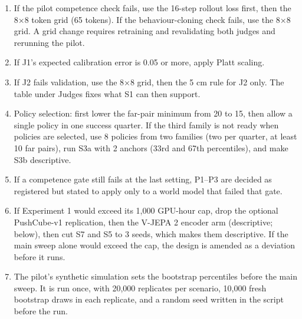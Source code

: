 \documentclass[10pt,letterpaper]{article}
\providecommand{\tightlist}{\setlength{\itemsep}{0pt}\setlength{\parskip}{0pt}}
\begin{document}
\begin{enumerate}
\def\labelenumi{\arabic{enumi}.}
\tightlist
\item
  If the pilot competence check fails, use the 16-step
  rollout loss first, then the 8×8 token grid (65 tokens).
  If the behaviour-cloning check fails, use the 8×8 grid. A
  grid change requires retraining and revalidating both
  judges and rerunning the pilot.
\item
  If J1's expected calibration error is 0.05 or more, apply
  Platt scaling.
\item
  If J2 fails validation, use the 8×8 grid, then the 5 cm
  rule for J2 only. The table under Judges fixes what S1 can
  then support.
\item
  Policy selection: first lower the far-pair minimum from 20
  to 15, then allow a single policy in one success quarter.
  If the third family is not ready when policies are
  selected, use 8 policies from two families (two per
  quarter, at least 10 far pairs), run S3a with 2 anchors
  (33rd and 67th percentiles), and make S3b descriptive.
\item
  If a competence gate still fails at the last setting,
  P1--P3 are decided as registered but stated to apply only
  to a world model that failed that gate.
\item
  If Experiment 1 would exceed its 1,000 GPU-hour cap, drop
  the optional PushCube-v1 replication, then the V-JEPA 2
  encoder arm (descriptive; below), then cut S7 and S5 to 3
  seeds, which makes them descriptive. If the main sweep
  alone would exceed the cap, the design is amended as a
  deviation before it runs.
\item
  The pilot's synthetic simulation sets the bootstrap
  percentiles before the main sweep. It is run once, with
  20,000 replicates per scenario, 10,000 fresh bootstrap
  draws in each replicate, and a random seed written in the
  script before the run.


\end{enumerate}
\end{document}
